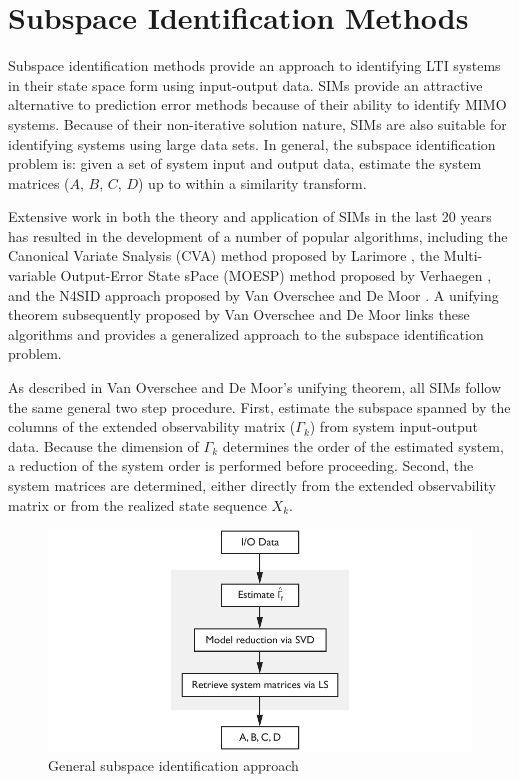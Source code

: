 \chapter{Subspace Identification Methods}\label{theory}
Subspace identification methods provide an approach to identifying LTI systems in their state space form using input-output data. SIMs provide an attractive alternative to prediction error methods because of their ability to identify MIMO systems. Because of their non-iterative solution nature, SIMs are also suitable for identifying systems using large data sets. In general, the subspace identification problem is: given a set of system input and output data, estimate the system matrices ($A$, $B$, $C$, $D$) up to within a similarity transform. 

Extensive work in both the theory and application of SIMs in the last 20 years has resulted in the development of a number of popular algorithms, including the Canonical Variate Snalysis (CVA) method proposed by Larimore \cite{larimore1990canonical}, the Multi-variable Output-Error State sPace (MOESP) method proposed by Verhaegen \cite{verhaegen1992subspace}, and the N4SID approach proposed by Van Overschee and De Moor \cite{van1994n4sid}. A unifying theorem subsequently proposed by Van Overschee and De Moor \cite{van1995unifying} links these algorithms and provides a generalized approach to the subspace identification problem.

As described in Van Overschee and De Moor's unifying theorem, all SIMs follow the same general two step procedure. First, estimate the subspace spanned by the columns of the extended observability matrix ($\Gamma_k$) from system input-output data. Because the dimension of $\Gamma_k$ determines the order of the estimated system, a reduction of the system order is performed before proceeding. Second, the system matrices are determined, either directly from the extended observability matrix or from the realized state sequence $X_k$.
\begin{figure}[htb!]
	\centering
	\includegraphics{../fig/sim_flow_diagram.pdf}
	\caption{General subspace identification approach}
\end{figure}

